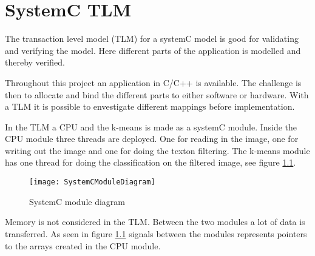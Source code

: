 \chapter{SystemC TLM}
The transaction level model (TLM) for a systemC model is good for validating and verifying the model. 
Here different parts of the application is modelled and thereby verified. 

Throughout this project an application in C/C++ is available. The challenge is then to allocate and bind the different parts to either software or hardware. 
With a TLM it is possible to envestigate different mappings before implementation. 

In the TLM a CPU and the k-means is made as a systemC module. Inside the CPU module three threads are deployed. One for reading in the image, one for writing out the image and one for doing the texton filtering. 
The k-means module has one thread for doing the classification on the filtered image, see figure \ref{fig:TLM}.

\begin{figure}[H]
\centering
\texttt{[image: SystemCModuleDiagram]}
\caption{SystemC module diagram}
\label{fig:TLM}
\end{figure}

Memory is not considered in the TLM. Between the two modules a lot of data is transferred. 
As seen in figure \ref{fig:TLM} signals between the modules represents pointers to the arrays created in the CPU module. 

